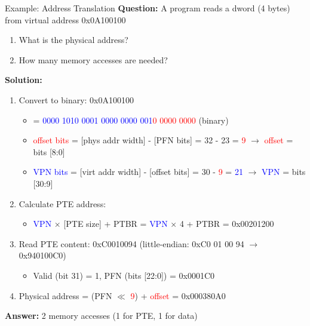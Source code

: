 \documentclass[aspectratio=169,12pt]{beamer}
\begin{document}
\begin{frame}{Example: Address Translation}
\textbf{Question:} A program reads a dword (4 bytes) from virtual address 0x0A100100
\begin{enumerate}
\item What is the physical address?
\item How many memory accesses are needed?
\end{enumerate}

\textbf{Solution:}
\pause
\begin{enumerate}
\item Convert to binary: 0x0A100100
\begin{itemize}
  \item = \textcolor{blue}{0000 1010 0001 0000 0000 001}\textcolor{red}{0 0000 0000} (binary)
  \item \textcolor{red}{offset bits} = [phys addr width] - [PFN bits] = 32 - 23 = \textcolor{red}{9} $\rightarrow$ \textcolor{red}{offset} = bits [8:0]
  \item \textcolor{blue}{VPN bits} = [virt addr width] - [offset bits] = 30 - \textcolor{red}{9} = \textcolor{blue}{21} $\rightarrow$ \textcolor{blue}{VPN} = bits [30:9]
\end{itemize}
\pause
\item Calculate PTE address:
\begin{itemize}
  \item \textcolor{blue}{VPN} × \textcolor{green!50!black}{[PTE size]} + PTBR = \textcolor{blue}{VPN} × \textcolor{green!50!black}{4} + PTBR = 0x00201200
\end{itemize}
\pause
\item Read PTE content: 0xC0010094 (little-endian: 0xC0 01 00 94 $\rightarrow$ 0x940100C0)
\begin{itemize}
  \item Valid (bit 31) = 1, PFN (bits [22:0]) = 0x0001C0
\end{itemize}
\pause
\item Physical address = (PFN $\ll$ \textcolor{red}{9}) + \textcolor{red}{offset} = 0x000380A0
\end{enumerate}

\pause
\textbf{Answer:} 2 memory accesses (1 for PTE, 1 for data)
\end{frame}
\end{document}
